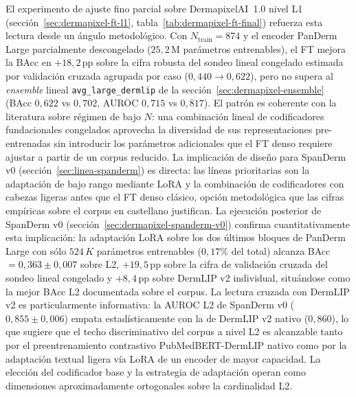 El experimento de ajuste fino parcial sobre DermapixelAI~1.0 nivel
L1 (secci\'on~\ref{sec:dermapixel-ft-l1},
tabla~\ref{tab:dermapixel-ft-final}) refuerza esta lectura desde
un ángulo metodológico. Con $N_{\mathrm{train}} = 874$ y el
encoder PanDerm Large parcialmente descongelado
($25{,}2$\,M parámetros entrenables), el FT mejora la BAcc en
$+18{,}2$\,pp sobre la cifra robusta del sondeo lineal congelado
estimada por validación cruzada agrupada por caso
($0{,}440 \to 0{,}622$), pero no supera al \emph{ensemble} lineal
\texttt{avg\_large\_dermlip} de la
secci\'on~\ref{sec:dermapixel-ensemble} (BAcc $0{,}622$ vs
$0{,}702$, AUROC $0{,}715$ vs $0{,}817$). El patrón es coherente
con la literatura sobre régimen de bajo $N$: una combinación
lineal de codificadores fundacionales congelados aprovecha la
diversidad de sus representaciones pre-entrenadas sin introducir
los parámetros adicionales que el FT denso requiere ajustar a
partir de un corpus reducido. La implicación de diseño para
SpanDerm v0 (secci\'on~\ref{sec:linea-spanderm}) es directa: las
líneas prioritarias son la adaptación de bajo rango mediante
LoRA y la combinación de codificadores con cabezas ligeras antes
que el FT denso clásico, opción metodológica que las cifras
empíricas sobre el corpus en castellano justifican. La ejecución
posterior de SpanDerm v0
(secci\'on~\ref{sec:dermapixel-spanderm-v0}) confirma
cuantitativamente esta implicación: la adaptación LoRA sobre los
dos últimos bloques de PanDerm Large con sólo $524\,K$
parámetros entrenables ($0{,}17\%$ del total) alcanza BAcc
$= 0{,}363 \pm 0{,}007$ sobre L2, $+19{,}5$\,pp sobre la cifra
de validación cruzada del sondeo lineal congelado y $+8{,}4$\,pp
sobre DermLIP v2 individual, situándose como la mejor BAcc L2
documentada sobre el corpus. La lectura cruzada con DermLIP v2 es
particularmente informativa: la AUROC L2 de SpanDerm v0
($0{,}855 \pm 0{,}006$) empata estadísticamente con la de
DermLIP v2 nativo ($0{,}860$), lo que sugiere que el techo
discriminativo del corpus a nivel L2 es alcanzable tanto por el
preentrenamiento contrastivo PubMedBERT-DermLIP nativo como por
la adaptación textual ligera vía LoRA de un encoder de mayor
capacidad. La elección del codificador base y la estrategia de
adaptación operan como dimensiones aproximadamente ortogonales
sobre la cardinalidad L2.

